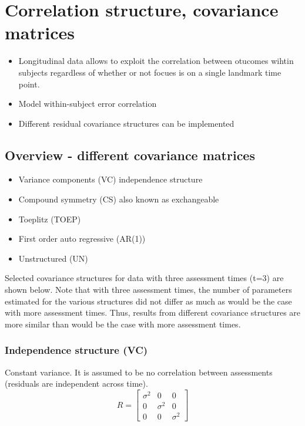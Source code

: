 \documentclass[
  letterpaper,
  DIV=11,
  numbers=noendperiod]{scrreprt}
\providecommand{\tightlist}{%
  \setlength{\itemsep}{0pt}\setlength{\parskip}{0pt}}\usepackage{longtable,booktabs,array}
\begin{document}
\hypertarget{correlation-structure-covariance-matrices}{%
\chapter{Correlation structure, covariance
matrices}\label{correlation-structure-covariance-matrices}}

\begin{itemize}
\tightlist
\item
  Longitudinal data allows to exploit the correlation between otucomes
  wihtin subjects regardless of whether or not focues is on a single
  landmark time point.
\item
  Model within-subject error correlation
\item
  Different residual covariance structures can be implemented
\end{itemize}

\hypertarget{overview---different-covariance-matrices}{%
\section{Overview - different covariance
matrices}\label{overview---different-covariance-matrices}}

\begin{itemize}
\tightlist
\item
  Variance components (VC) independence structure
\item
  Compound symmetry (CS) also known as exchangeable
\item
  Toeplitz (TOEP)
\item
  First order auto regressive (AR(1))
\item
  Unstructured (UN)
\end{itemize}

Selected covariance structures for data with three assessment times
(t=3) are shown below. Note that with three assessment times, the number
of parameters estimated for the various structures did not differ as
much as would be the case with more assessment times. Thus, results from
different covariance structures are more similar than would be the case
with more assessment times.

\hypertarget{independence-structure-vc}{%
\subsection{Independence structure
(VC)}\label{independence-structure-vc}}

Constant variance. It is assumed to be no correlation between
assessments (residuals are independent across time).
\[ R = \begin{bmatrix}
   \sigma^2   & 0  & 0  \\
   0  & \sigma^2   & 0 \\
   0  & 0  & \sigma^2
   \end{bmatrix}\]
\end{document}
